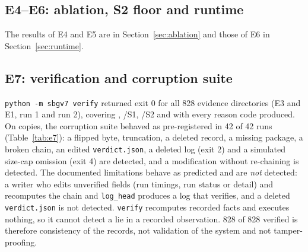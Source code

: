 \subsection{E4--E6: ablation, S2 floor and runtime}
The results of E4 and E5 are in Section~\ref{sec:ablation} and those of E6 in Section~\ref{sec:runtime}.

\subsection{E7: verification and corruption suite}
\texttt{python -m sbgv7 verify} returned exit 0 for all 828 evidence directories (E3 and E1, run 1 and run 2), covering \DIV{}, \NDO{}/S1, \NDO{}/S2 and \INS{} with every reason code produced. On copies, the corruption suite behaved as pre-registered in 42 of 42 runs (Table~\ref{tab:e7}): a flipped byte, truncation, a deleted record, a missing package, a broken chain, an edited \texttt{verdict.json}, a deleted log (exit 2) and a simulated size-cap omission (exit 4) are detected, and a modification without re-chaining is detected. The documented limitations behave as predicted and are \emph{not} detected: a writer who edits unverified fields (run timings, run status or detail) and recomputes the chain and \texttt{log\_head} produces a log that verifies, and a deleted \texttt{verdict.json} is not detected. \texttt{verify} recomputes recorded facts and executes nothing, so it cannot detect a lie in a recorded observation. 828 of 828 verified is therefore consistency of the records, not validation of the system and not tamper-proofing.

